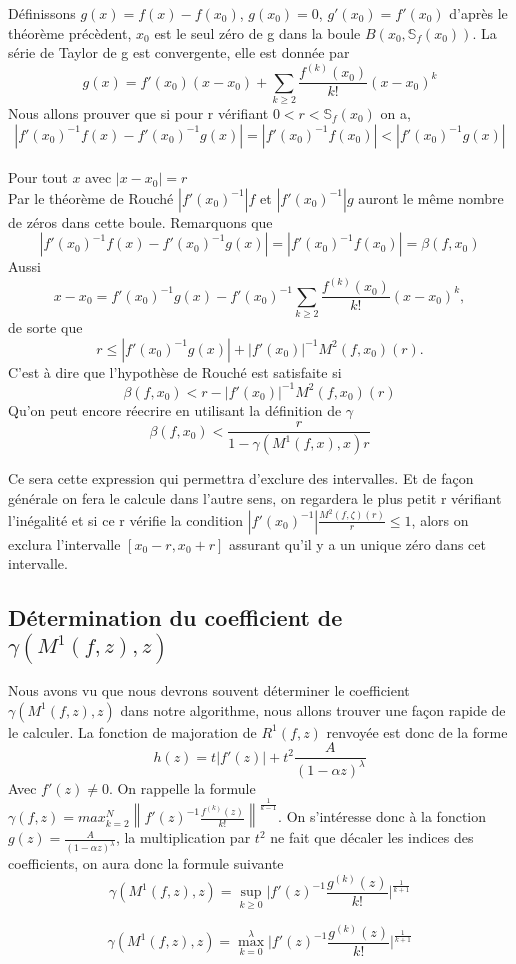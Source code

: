 \documentclass[a4paper,10.5pt]{article}
\begin{document}
	 \vspace{7mm}	
	 
	
	\begin{demonstration}
	
	Définissons $g(x)=f(x)-f(x_0)$, $g(x_0)=0$, $g'(x_0)=f'(x_0)$ d'après le théorème précèdent, $x_0$ est le seul zéro de g dans la boule
	$B(x_0,\mathbb{S}_{f}(x_0))$. La série de Taylor de g est convergente, elle est donnée par
	\[g(x)=f'(x_0)(x-x_0)+ \sum_{k \geq 2}\frac{f^{(k)}(x_0)}{k!}(x-x_0)^k\]
	Nous allons prouver que si pour r vérifiant $0<r<\mathbb{S}_{f}(x_0)$ on a,
	\[|f'(x_0)^{-1}f(x)-f'(x_0)^{-1}g(x)|=|f'(x_0)^{-1}f(x_0)|<|f'(x_0)^{-1}g(x)|\]
	\\
	Pour tout $x$ avec $|x-x_0|=r$
	\\
	Par le théorème de Rouché $|f'(x_0)^{-1}|f$ et $|f'(x_0)^{-1}|g$ auront le même nombre de zéros dans cette boule. Remarquons que 
	\[|f'(x_0)^{-1}f(x)-f'(x_0)^{-1}g(x)|=|f'(x_0)^{-1}f(x_0)|=\beta(f,x_0)\]
	Aussi
	\[x-x_0=f'(x_0)^{-1}g(x)-f'(x_0)^{-1}\sum_{k \geq 2}\frac{f^{(k)}(x_0)}{k!}(x-x_0)^k,\]
	de sorte que
	\[r \leq |f'(x_0)^{-1}g(x)|+|f'(x_0)|^{-1}M^{2}(f,x_0)(r) .\]
	C'est à dire que l'hypothèse de Rouché est satisfaite si
	\[\beta(f,x_0)<r-|f'(x_0)|^{-1}M^{2}(f,x_0)(r)\] 
	Qu'on peut encore réecrire en utilisant la définition de $\gamma$
	\[\beta(f,x_0)< \frac{r}{1 -\gamma(M^1(f,x),x)r}\]
	
	\end{demonstration}
	Ce sera cette expression qui permettra d'exclure des intervalles. Et de façon générale on fera le calcule dans l'autre sens, on regardera le plus petit r vérifiant l'inégalité et si ce r vérifie la condition $|f'(x_0)^{-1}|\frac{M^{2}(f,\zeta)(r)}{r}\leq 1$, alors on exclura l'intervalle $[x_0-r,x_0+r]$ assurant qu'il y a un unique zéro dans cet intervalle.

	\subsection{Détermination du coefficient de $\gamma(M^1(f,z),z)$}
	Nous avons vu que nous devrons souvent déterminer le coefficient $\gamma(M^1(f,z),z)$ dans notre algorithme, nous allons trouver une façon rapide de le calculer.
	La fonction de majoration de $R^1(f,z)$ renvoyée est donc de la  forme
	\[h(z)=t|f'(z)|+t^2\frac{A}{(1-\alpha z)^{\lambda}}\]
	Avec $f'(z)\neq 0$. On rappelle la formule $\gamma(f,z)=max_{k=2}^{N}\left\|f'(z)^{-1}\frac{f^{(k)}(z)}{k!}\right\|^{\frac{1}{k-1}}$. 
	On s'intéresse donc à la fonction $g(z)=\frac{A}{(1-\alpha z)^{\lambda}}$, la multiplication par $t^2$ ne fait que décaler les indices des coefficients, on aura donc la formule suivante
	\[\gamma(M^1(f,z),z)=\sup_{k\geq0}\Big|f'(z)^{-1}\frac{g^{(k)}(z)}{k!}\Big|^{\frac{1}{k+1}}\]
	\begin{theorem}
		\[\gamma(M^1(f,z),z)=\max_{k=0}^{\lambda}\Big|f'(z)^{-1}\frac{g^{(k)}(z)}{k!}\Big|^{\frac{1}{k+1}}\]
	\end{theorem}
	
\end{document}
